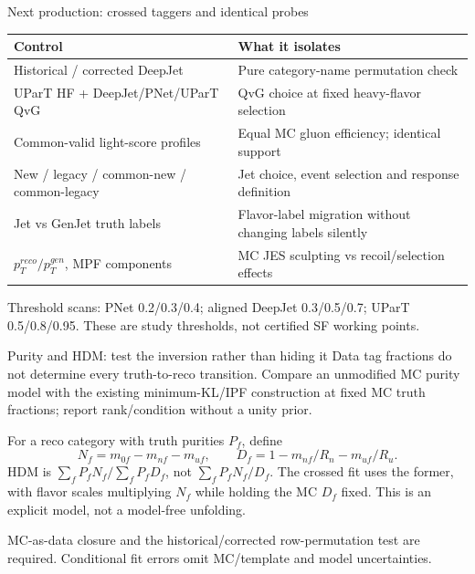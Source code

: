 \documentclass[aspectratio=169,10pt]{beamer}
\begin{document}
\begin{frame}{Next production: crossed taggers and identical probes}
\small
\begin{tabular}{>{\raggedright\arraybackslash}p{}p{}}
\toprule Control & What it isolates\\\midrule
Historical / corrected DeepJet & Pure category-name permutation check\\
UParT HF + DeepJet/PNet/UParT QvG & QvG choice at fixed heavy-flavor selection\\
Common-valid light-score profiles & Equal MC gluon efficiency; identical support\\
New / legacy / common-new / common-legacy & Jet choice, event selection and response definition\\
Jet vs GenJet truth labels & Flavor-label migration without changing labels silently\\
$p_T^{reco}/p_T^{gen}$, MPF components & MC JES sculpting vs recoil/selection effects\\\bottomrule
\end{tabular}
\medskip

Threshold scans: PNet 0.2/0.3/0.4; aligned DeepJet 0.3/0.5/0.7;
UParT 0.5/0.8/0.95. These are study thresholds, not certified SF working points.
\end{frame}
\begin{frame}{Purity and HDM: test the inversion rather than hiding it}
\small
Data tag fractions do not determine every truth-to-reco transition.
Compare an unmodified MC purity model with the existing minimum-KL/IPF
construction at fixed MC truth fractions; report rank/condition without a unity prior.
\medskip

For a reco category with truth purities $P_f$, define
\[
N_f=m_{0f}-m_{nf}-m_{uf},\qquad D_f=1-m_{nf}/R_n-m_{uf}/R_u.
\]
HDM is $\sum_f P_fN_f/\sum_fP_fD_f$, not $\sum_fP_fN_f/D_f$.
The crossed fit uses the former, with flavor scales multiplying $N_f$ while
holding the MC $D_f$ fixed. This is an explicit model, not a model-free unfolding.
\medskip

MC-as-data closure and the historical/corrected row-permutation test are required.
Conditional fit errors omit MC/template and model uncertainties.
\end{frame}
\end{document}

